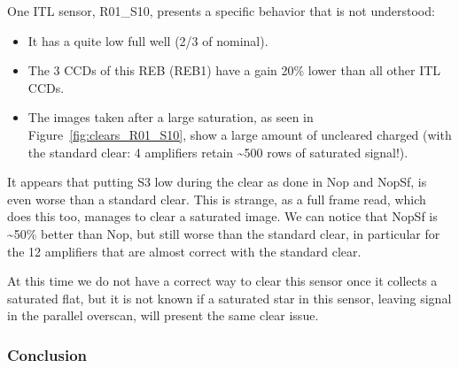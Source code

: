 
One ITL sensor, R01\_S10,
presents a specific behavior that is not understood:

\begin{itemize}
\tightlist
\item
  It has a quite low full well (2/3 of nominal).
\item
  The 3 CCDs of this REB (REB1) have a gain 20\% lower than all other ITL CCDs.
\item
  The images taken after a large saturation, as seen in Figure~\ref{fig:clears_R01_S10},
  show a large amount of uncleared charged (with the standard clear: 4
  amplifiers retain \textasciitilde500 rows of saturated signal!).
\end{itemize}

It appears that putting S3 low during the clear as done in Nop and NopSf,
is even worse than a standard clear. This is strange, as a full frame
read, which does this too, manages to clear a saturated image. We can notice
that NopSf is \textasciitilde50\% better than Nop, but still worse than
the standard clear, in particular for the 12 amplifiers that are almost correct
with the standard clear.

At this time we do not have a correct way to clear this
sensor once it collects a saturated flat, but it is not
known if a saturated star in this sensor, leaving signal in the
parallel overscan, will present the same clear issue.

\subsubsection{Conclusion}\label{conclusion}





